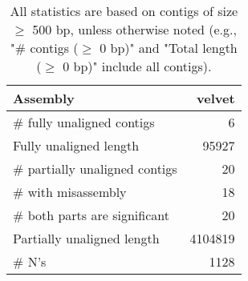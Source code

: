 \documentclass[12pt,a4paper]{article}
\begin{document}
\begin{table}[ht]
\begin{center}
\caption{All statistics are based on contigs of size $\geq$ 500 bp, unless otherwise noted (e.g., "\# contigs ($\geq$ 0 bp)" and "Total length ($\geq$ 0 bp)" include all contigs).}
\begin{tabular}{|l*{1}{|r}|}
\hline
Assembly & velvet \\ \hline
\# fully unaligned contigs & 6 \\ \hline
Fully unaligned length & 95927 \\ \hline
\# partially unaligned contigs & 20 \\ \hline
\hspace{5mm}\# with misassembly & 18 \\ \hline
\hspace{5mm}\# both parts are significant & 20 \\ \hline
Partially unaligned length & 4104819 \\ \hline
\# N's & 1128 \\ \hline
\end{tabular}
\end{center}
\end{table}
\end{document}
